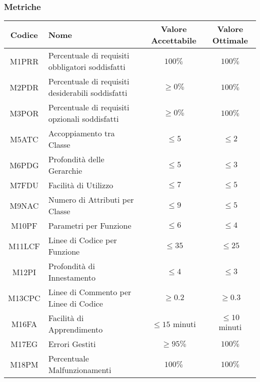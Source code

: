 \subsubsection{Metriche}
\begin{center}
	\renewcommand{\arraystretch}{1.8}
	\begin{tabular}{ |c|m{14em}|c|c|}
		\hline
		\textbf{Codice} & \textbf{Nome} & \textbf{Valore Accettabile} & \textbf{Valore Ottimale} \\
		\hline
		M1PRR & Percentuale di requisiti obbligatori soddisfatti & $ 100\% $ & $ 100\% $ \\
		\hline
		M2PDR & Percentuale di requisiti desiderabili soddisfatti & $ \geq 0\% $ & $ 100\% $ \\
		\hline
		M3POR & Percentuale di requisiti opzionali soddisfatti & $ \geq 0\% $ & $ 100\% $ \\
	  \hline
		M5ATC & Accoppiamento tra Classe & $ \leq 5 $ & $ \leq 2 $\\
		\hline
		M6PDG & Profondità delle Gerarchie & $ \leq 5 $ & $ \leq 3 $\\
		\hline
		M7FDU & Facilità di Utilizzo & $ \leq 7 $ & $ \leq 5 $\\
		\hline
		M9NAC & Numero di Attributi per Classe & $ \leq 9 $ & $ \leq 5 $\\
		\hline
		M10PF & Parametri per Funzione & $ \leq 6 $ & $ \leq 4 $\\
		\hline
		M11LCF & Linee di Codice per Funzione & $ \leq 35 $ & $ \leq 25 $\\
		\hline
		M12PI & Profondità di Innestamento & $ \leq 4 $ & $ \leq 3 $\\
		\hline
		M13CPC & Linee di Commento per Linee di Codice & $ \geq 0.2 $ & $ \geq 0.3 $\\
		\hline
		M16FA & Facilità di Apprendimento & $ \leq 15 $ minuti & $ \leq 10 $ minuti\\
		\hline
		M17EG & Errori Gestiti & $ \geq 95\% $ & $  100\% $\\
		\hline
		M18PM & Percentuale Malfunzionamenti & $  100\% $ & $ 100\% $\\
		\hline
	\end{tabular}
\end{center}